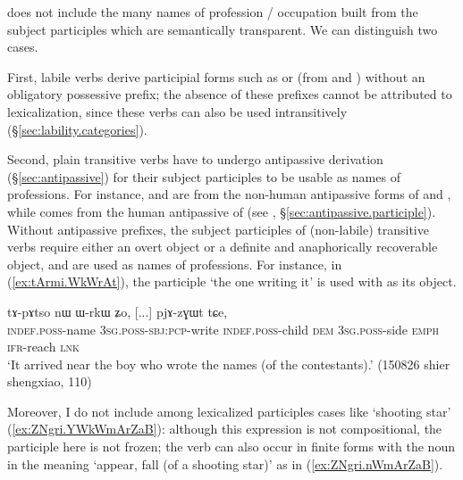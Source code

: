  does not include the many names of profession / occupation built from the subject participles which are semantically transparent. We can distinguish two cases. 

First, labile verbs derive participial forms such as  or  (from  and ) without an obligatory possessive prefix; the absence of these prefixes cannot be attributed to lexicalization, since these verbs can also be used intransitively (§\ref{sec:lability.categories}). 

Second, plain transitive verbs have to undergo antipassive derivation (§\ref{sec:antipassive}) for their subject participles to be usable as names of professions. For instance,  and  are from the  non-human antipassive forms of  and , while   comes from the  human antipassive of (see , §\ref{sec:antipassive.participle}). Without antipassive prefixes, the subject participles of (non-labile) transitive verbs require either an overt object or a definite and anaphorically recoverable object, and are used as names of professions. For instance, in (\ref{ex:tArmi.WkWrAt}), the participle  `the one writing it' is used with  as its object.

\begin{exe}
\ex \label{ex:tArmi.WkWrAt}
  tɤ-pɤtso nɯ ɯ-rkɯ ʑo, [...] pjɤ-zɣɯt tɕe, \\
 \textsc{indef}.\textsc{poss}-name \textsc{3sg}.\textsc{poss}-\textsc{sbj}:\textsc{pcp}-write  \textsc{indef}.\textsc{poss}-child \textsc{dem} \textsc{3sg}.\textsc{poss}-side \textsc{emph} { } \textsc{ifr}-reach \textsc{lnk} \\
\glt `It arrived near the boy who wrote the names (of the contestants).' (150826 shier shengxiao, 110)
\end{exe}

Moreover, I do not include among lexicalized participles cases like `shooting star' (\ref{ex:ZNgri.YWkWmArZaB}): although this expression is not compositional, the participle here is not frozen; the verb  can also occur in finite forms with the noun  in the meaning `appear, fall (of a shooting star)' as in (\ref{ex:ZNgri.nWmArZaB}).

